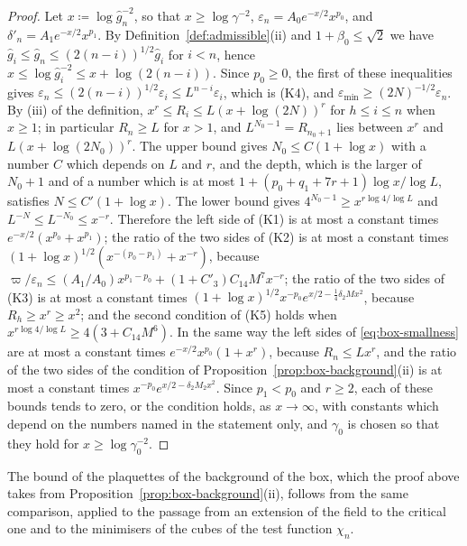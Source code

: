 \documentclass[11pt]{preprint}
\numberwithin{equation}{section}
\begin{document}
\begin{proof}
Let $x \coloneqq \log\hat g_n^{-2}$, so that $x \geqslant \log\gamma^{-2}$, $\varepsilon_n = A_0e^{-x/2}x^{p_0}$, and $\delta'_n = A_1e^{-x/2}x^{p_1}$. By Definition~\ref{def:admissible}(ii) and $1 + \beta_0 \leqslant \sqrt 2$ we have $\hat g_i \leqslant \hat g_n \leqslant (2(n - i))^{1/2}\hat g_i$ for $i < n$, hence $x \leqslant \log\hat g_i^{-2} \leqslant x + \log(2(n - i))$. Since $p_0 \geqslant 0$, the first of these inequalities gives $\varepsilon_n \leqslant (2(n - i))^{1/2}\varepsilon_i \leqslant L^{n-i}\varepsilon_i$, which is (K4), and $\varepsilon_{\min} \geqslant (2N)^{-1/2}\varepsilon_n$. By (iii) of the definition, $x^r \leqslant R_i \leqslant L(x + \log(2N))^r$ for $h \leqslant i \leqslant n$ when $x \geqslant 1$; in particular $R_n \geqslant L$ for $x > 1$, and $L^{N_0-1} = R_{n_0+1}$ lies between $x^r$ and $L(x + \log(2N_0))^r$. The upper bound gives $N_0 \leqslant C(1 + \log x)$ with a number $C$ which depends on $L$ and $r$, and the depth, which is the larger of $N_0 + 1$ and of a number which is at most $1 + (p_0 + q_1 + 7r + 1)\log x/\log L$, satisfies $N \leqslant C'(1 + \log x)$. The lower bound gives $4^{N_0-1} \geqslant x^{r\log 4/\log L}$ and $L^{-N} \leqslant L^{-N_0} \leqslant x^{-r}$. Therefore the left side of (K1) is at most a constant times $e^{-x/2}(x^{p_0} + x^{p_1})$; the ratio of the two sides of (K2) is at most a constant times $(1 + \log x)^{1/2}(x^{-(p_0 - p_1)} + x^{-r})$, because $\varpi/\varepsilon_n \leqslant (A_1/A_0)x^{p_1-p_0} + (1 + C'_3)C_{14}M^7x^{-r}$; the ratio of the two sides of (K3) is at most a constant times $(1 + \log x)^{1/2}x^{-p_0}e^{x/2 - \frac{1}{4}\delta_2Mx^2}$, because $R_h \geqslant x^r \geqslant x^2$; and the second condition of (K5) holds when $x^{r\log 4/\log L} \geqslant 4(3 + C_{14}M^6)$. In the same way the left sides of \eqref{eq:box-smallness} are at most a constant times $e^{-x/2}x^{p_0}(1 + x^r)$, because $R_n \leqslant Lx^r$, and the ratio of the two sides of the condition of Proposition~\ref{prop:box-background}(ii) is at most a constant times $x^{-p_0}e^{x/2 - \delta_2M_2x^2}$. Since $p_1 < p_0$ and $r \geqslant 2$, each of these bounds tends to zero, or the condition holds, as $x \to \infty$, with constants which depend on the numbers named in the statement only, and $\gamma_0$ is chosen so that they hold for $x \geqslant \log\gamma_0^{-2}$.
\end{proof}

The bound of the plaquettes of the background of the box, which the proof above takes from Proposition~\ref{prop:box-background}(ii), follows from the same comparison, applied to the passage from an extension of the field to the critical one and to the minimisers of the cubes of the test function $\chi_n$.
\end{document}
